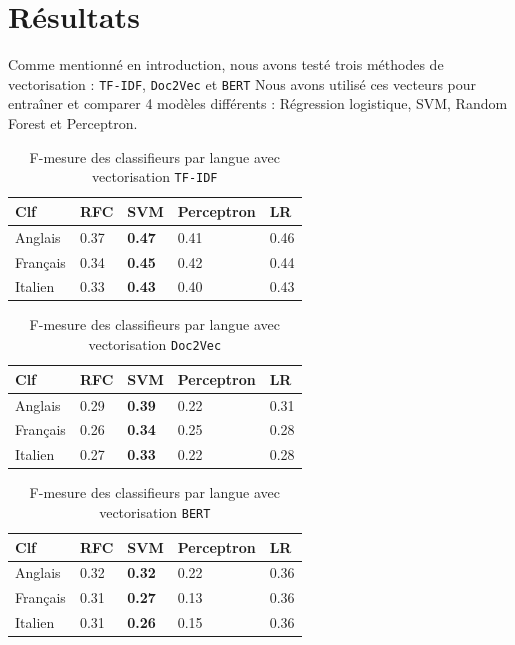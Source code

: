 \section{Résultats}

Comme mentionné en introduction, nous avons testé trois méthodes de vectorisation : \texttt{TF-IDF}, \texttt{Doc2Vec} et \texttt{BERT}
Nous avons utilisé ces vecteurs pour entraîner et comparer 4 modèles différents : Régression logistique, SVM, Random Forest et Perceptron.


\begin{table}[h]
    \centering
    \begin{tabular}{|l|l|l|l|l|}
        \hline
        Clf & RFC & SVM & Perceptron & LR \\
        \hline
        Anglais & 0.37 & \textbf{0.47} & 0.41 & 0.46 \\
        \hline
        Français & 0.34 & \textbf{0.45} & 0.42 & 0.44 \\
        \hline
        Italien & 0.33 & \textbf{0.43} & 0.40 & 0.43 \\
        \hline
    \end{tabular}
    \caption{F-mesure des classifieurs par langue avec vectorisation \texttt{TF-IDF}}
    \label{tab:comparaison_vecteurs}
\end{table}

\begin{table}[h]
    \centering
    \begin{tabular}{|l|l|l|l|l|}
        \hline
        Clf & RFC & SVM & Perceptron & LR \\
        \hline
        Anglais & 0.29 & \textbf{0.39} & 0.22 & 0.31 \\
        \hline
        Français & 0.26 & \textbf{0.34} & 0.25 & 0.28 \\
        \hline
        Italien & 0.27 & \textbf{0.33} & 0.22 & 0.28 \\
        \hline
    \end{tabular}
    \caption{F-mesure des classifieurs par langue avec vectorisation \texttt{Doc2Vec}}
    \label{tab:comparaison_vecteurs}
\end{table}

\begin{table}[h]
    \centering
    \begin{tabular}{|l|l|l|l|l|}
        \hline
        Clf & RFC & SVM & Perceptron & LR \\
        \hline
        Anglais & 0.32 & \textbf{0.32} & 0.22 & 0.36 \\
        \hline
        Français & 0.31 & \textbf{0.27} & 0.13 & 0.36 \\
        \hline
        Italien & 0.31 & \textbf{0.26} & 0.15 & 0.36 \\
        \hline
    \end{tabular}
    \caption{F-mesure des classifieurs par langue avec vectorisation \texttt{BERT}}
    \label{tab:comparaison_vecteurs}
\end{table}

